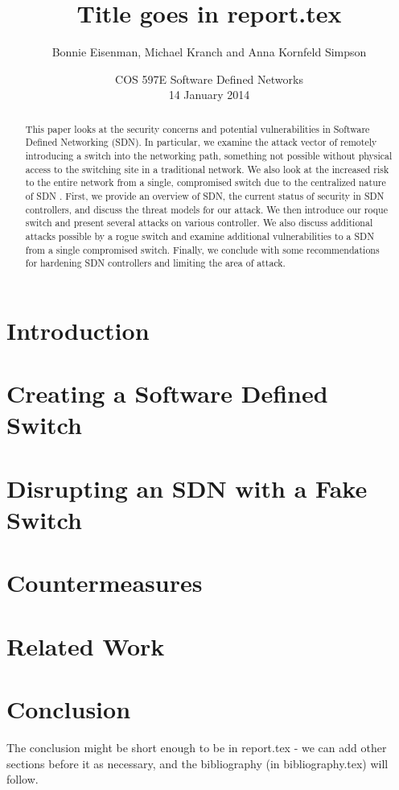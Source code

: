 \documentclass[11pt, letterpaper, twocolumn, twoside]{article}
\title{Title goes in report.tex}
\author{Bonnie Eisenman, Michael Kranch and Anna Kornfeld Simpson}
\date{COS 597E Software Defined Networks \\ 14 January 2014}
\begin{document}
\maketitle

\begin{spacing}{1.0}

\begin{abstract}
This paper looks at the security concerns and potential vulnerabilities in Software Defined Networking (SDN). In particular, we examine the attack vector of remotely introducing a switch into the networking path, something not possible without physical access to the switching site in a traditional network. We also look at the increased risk to the entire network from a single, compromised switch due to the centralized nature of SDN . First, we provide an overview of SDN, the current status of security in SDN controllers, and discuss the threat models for our attack. We then introduce our roque switch and present several  attacks on various controller. We also discuss additional attacks possible by a rogue switch and examine additional vulnerabilities to a SDN from a single compromised switch. Finally, we conclude with some recommendations for hardening SDN controllers and limiting the area of attack.
\end{abstract}


\section{Introduction}



\section{Creating a Software Defined Switch}
\label{fake}


\section{Disrupting an SDN with a Fake Switch}
\label{attacks}


\section{Countermeasures}
\label{countermeasures}


\section{Related Work}
\label{related}


\section{Conclusion}
The conclusion might be short enough to be in report.tex - we can add other sections before it as necessary, and the bibliography (in bibliography.tex) will follow.





\end{spacing}
\end{document}

